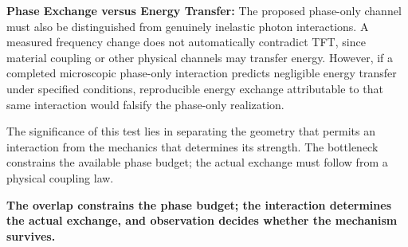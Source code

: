 \medskip
\noindent\textbf{Phase Exchange versus Energy Transfer:}
The proposed phase-only channel must also be distinguished
from genuinely inelastic photon interactions. A measured
frequency change does not automatically contradict TFT,
since material coupling or other physical channels may
transfer energy. However, if a completed microscopic
phase-only interaction predicts negligible energy transfer
under specified conditions, reproducible energy exchange
attributable to that same interaction would falsify
the phase-only realization.

\medskip
The significance of this test lies in separating the
geometry that permits an interaction from the mechanics
that determines its strength. The bottleneck constrains
the available phase budget; the actual exchange must
follow from a physical coupling law.

\medskip
\noindent\textbf{The overlap constrains the phase budget;
the interaction determines the actual exchange, and
observation decides whether the mechanism survives.}